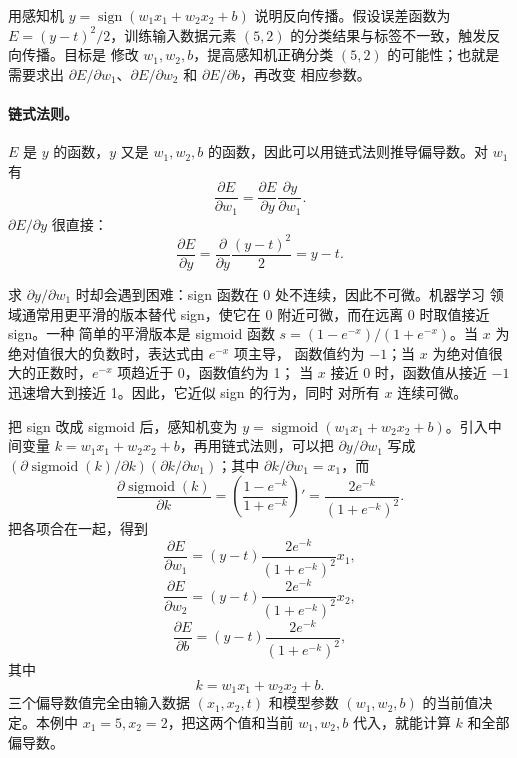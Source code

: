 用感知机 $y=\operatorname{sign}(w_1x_1+w_2x_2+b)$ 说明反向传播。假设误差函数为
$E=(y-t)^2/2$，训练输入数据元素 $(5,2)$ 的分类结果与标签不一致，触发反向传播。目标是
修改 $w_1,w_2,b$，提高感知机正确分类 $(5,2)$ 的可能性；也就是需要求出
$\partial E/\partial w_1$、$\partial E/\partial w_2$ 和 $\partial E/\partial b$，再改变
相应参数。

\paragraph{链式法则。}
$E$ 是 $y$ 的函数，$y$ 又是 $w_1,w_2,b$ 的函数，因此可以用链式法则推导偏导数。对
$w_1$ 有
\begin{equation}
  \frac{\partial E}{\partial w_1}=\frac{\partial E}{\partial y}
    \frac{\partial y}{\partial w_1}.
  \label{eq:appb-7}
\end{equation}
$\partial E/\partial y$ 很直接：
\begin{equation}
  \frac{\partial E}{\partial y}=\frac{\partial}{\partial y}
    \frac{(y-t)^2}{2}=y-t.
  \label{eq:appb-8}
\end{equation}

求 $\partial y/\partial w_1$ 时却会遇到困难：sign 函数在 0 处不连续，因此不可微。机器学习
领域通常用更平滑的版本替代 sign，使它在 0 附近可微，而在远离 0 时取值接近 sign。一种
简单的平滑版本是 sigmoid 函数
$s=(1-e^{-x})/(1+e^{-x})$。当 $x$ 为绝对值很大的负数时，表达式由 $e^{-x}$ 项主导，
函数值约为 $-1$；当 $x$ 为绝对值很大的正数时，$e^{-x}$ 项趋近于 0，函数值约为 1；
当 $x$ 接近 0 时，函数值从接近 $-1$ 迅速增大到接近 1。因此，它近似 sign 的行为，同时
对所有 $x$ 连续可微。

把 sign 改成 sigmoid 后，感知机变为
$y=\operatorname{sigmoid}(w_1x_1+w_2x_2+b)$。引入中间变量
$k=w_1x_1+w_2x_2+b$，再用链式法则，可以把 $\partial y/\partial w_1$ 写成
$(\partial\operatorname{sigmoid}(k)/\partial k)(\partial k/\partial w_1)$；其中
$\partial k/\partial w_1=x_1$，而
\begin{equation}
  \frac{\partial\operatorname{sigmoid}(k)}{\partial k}
  =\left(\frac{1-e^{-k}}{1+e^{-k}}\right)'=
  \frac{2e^{-k}}{(1+e^{-k})^2}.
  \label{eq:appb-9}
\end{equation}
把各项合在一起，得到
\begin{equation}
  \frac{\partial E}{\partial w_1}=(y-t)\frac{2e^{-k}}{(1+e^{-k})^2}x_1,
  \label{eq:appb-10}
\end{equation}
\begin{equation}
  \frac{\partial E}{\partial w_2}=(y-t)\frac{2e^{-k}}{(1+e^{-k})^2}x_2,
  \label{eq:appb-11}
\end{equation}
\begin{equation}
  \frac{\partial E}{\partial b}=(y-t)\frac{2e^{-k}}{(1+e^{-k})^2},
  \label{eq:appb-12}
\end{equation}
其中
\begin{equation}
  k=w_1x_1+w_2x_2+b.
  \label{eq:appb-13}
\end{equation}
三个偏导数值完全由输入数据 $(x_1,x_2,t)$ 和模型参数 $(w_1,w_2,b)$ 的当前值决定。本例中
$x_1=5,x_2=2$，把这两个值和当前 $w_1,w_2,b$ 代入，就能计算 $k$ 和全部偏导数。

